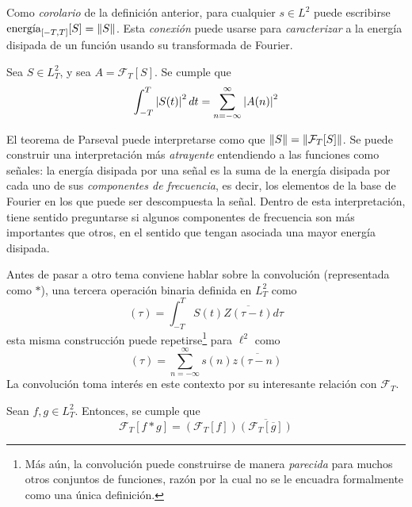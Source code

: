 Como \textit{corolario} de la definición anterior, para cualquier $s\in L^{2}$ puede escribirse $\text{energía}_{[-T,T]}[S] = \left\Vert S \right\Vert$.
%
Esta \textit{conexión} puede usarse para \textit{caracterizar} a la energía disipada de un función usando su transformada de Fourier.

\begin{teorema}[Parseval]
Sea $S \in L^{2}_T$, y sea $A = \mathcal{F}_T[S]$. Se cumple que
\begin{equation*}
\int_{-T}^{T} \left| S(t) \right|^{2} dt = \sum_{n=-\infty}^{\infty} \left| A(n) \right|^{2}
\end{equation*}
\label{parseval}
\end{teorema}

El teorema de Parseval puede interpretarse como que $\left\Vert S \right\Vert = \left\Vert \mathcal{F}_T[S] \right\Vert$.
%
Se puede construir una interpretación más \textit{atrayente} entendiendo a las funciones como señales:
la energía disipada por una señal es la suma de la energía disipada por cada uno de sus \textit{componentes de frecuencia}, es decir, los elementos de la base de Fourier en los que puede ser descompuesta la señal.
%
Dentro de esta interpretación, tiene sentido preguntarse si algunos componentes de frecuencia son más importantes que otros, en el sentido que tengan asociada una mayor energía disipada.

Antes de pasar a otro tema conviene hablar sobre la convolución (representada como $\ast$), una tercera operación binaria definida en $L^{2}_T$ como
\begin{equation}
[S \ast Z] (\tau) = \int_{-T}^{T} S(t) \overline{Z(\tau-t)} d\tau
\end{equation}
esta misma construcción puede repetirse\footnote{Más aún, la convolución puede construirse de manera \textit{parecida} para muchos otros conjuntos de funciones, razón por la cual no se le encuadra formalmente como una única definición.} para $\ell^{2}$ como
\begin{equation}
[s \ast z] (\tau) = \sum_{n=-\infty}^{\infty} s(n) \overline{z(\tau-n)}
\end{equation}
La convolución toma interés en este contexto por su interesante relación con $\mathcal{F}_T$.

\begin{teorema}
Sean $f, g \in L^{2}_T$. Entonces, se cumple que
\begin{equation}
\mathcal{F}_T[f \ast g] = \left( \mathcal{F}_T[f] \right) \overline{\left( \mathcal{F}_T[\overline{g}] \right)}
\end{equation}
\end{teorema}

